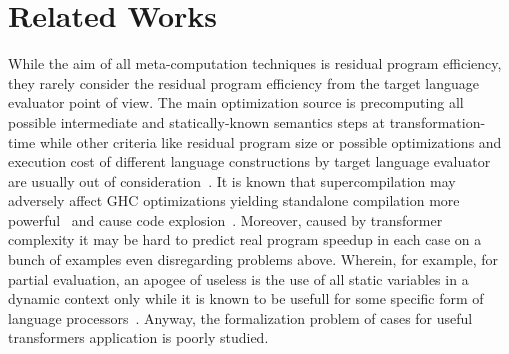 \section{Related Works}


While the aim of all meta-computation techniques is residual program efficiency, they rarely consider the residual program efficiency from the target language evaluator point of view.
The main optimization source is precomputing all possible intermediate and statically-known semantics steps at transformation-time while other criteria like residual program size or possible optimizations and execution cost of different language constructions by target language evaluator are usually out of consideration~\cite{jonesbook}.
It is known that supercompilation may adversely affect GHC optimizations yielding standalone compilation more powerful~\cite{SCBE,TCES} and cause code explosion~\cite{SCHC}.
Moreover, caused by transformer complexity it may be hard to predict real program speedup in each case on a bunch of examples even disregarding problems above.
Wherein, for example, for partial evaluation, an apogee of useless is the use of all static variables in a dynamic context only while it is known to be usefull for some specific form of language processors~\cite{jonesbook,bulyonkov84}.
Anyway, the formalization problem of cases for useful transformers application is poorly studied.